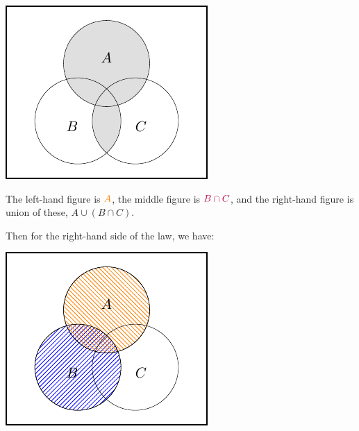 \documentclass[
  a4paper,
]{book}
\theoremstyle{definition}
\theoremstyle{definition}
\theoremstyle{definition}
\theoremstyle{definition}
\theoremstyle{remark}
\begin{document}
\begin{center}\includegraphics[width=1\linewidth]{math1710_files/figure-latex/dist3-1} \end{center}

The left-hand figure is \(\color{orange}{A}\), the middle figure is \(\color{purple}{B\cap C}\), and the right-hand figure is union of these, \(A\cup (B\cap C)\).

Then for the right-hand side of the law, we have:

\begin{center}\includegraphics[width=1\linewidth]{math1710_files/figure-latex/dist4-1} \end{center}
\end{document}
